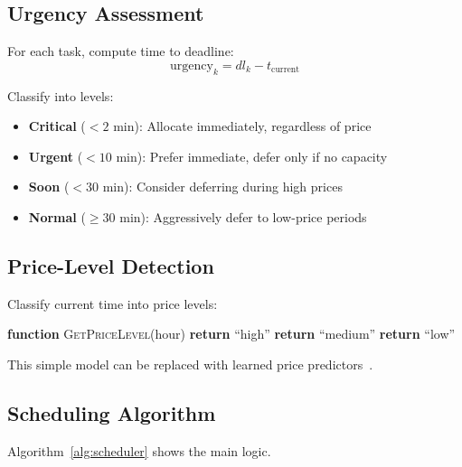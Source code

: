 \documentclass[10pt,conference]{IEEEtran}
\begin{document}
\subsection{Urgency Assessment}

For each task, compute time to deadline:
\begin{equation}
\text{urgency}_k = dl_k - t_{\text{current}}
\end{equation}

Classify into levels:
\begin{itemize}
    \item \textbf{Critical} ($< 2$ min): Allocate immediately, regardless of price
    \item \textbf{Urgent} ($< 10$ min): Prefer immediate, defer only if no capacity
    \item \textbf{Soon} ($< 30$ min): Consider deferring during high prices
    \item \textbf{Normal} ($\geq 30$ min): Aggressively defer to low-price periods
\end{itemize}

\subsection{Price-Level Detection}

Classify current time into price levels:
\begin{algorithmic}[1]
\STATE \textbf{function} \textsc{GetPriceLevel}(hour)
    \STATE \textbf{return} ``high''
    \STATE \textbf{return} ``medium''
\ELSE
    \STATE \textbf{return} ``low''
\ENDIF
\end{algorithmic}

This simple model can be replaced with learned price predictors~\cite{dangana2025ksurf}.

\subsection{Scheduling Algorithm}

Algorithm~\ref{alg:scheduler} shows the main logic.
\end{document}

